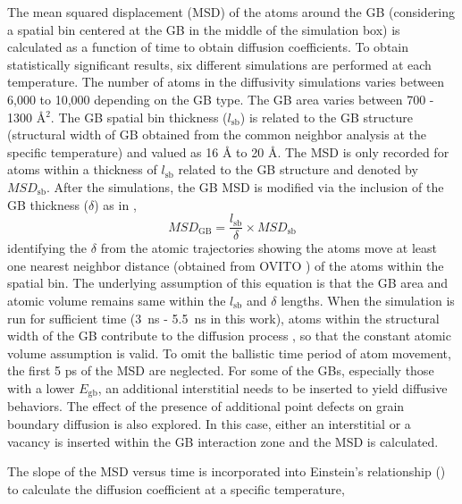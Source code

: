 \documentclass[review]{elsarticle}
\providecommand{\DIFaddtex}[1]{{\bf #1}} %
\providecommand{\DIFdeltex}[1]{} %
\providecommand{\DIFaddbegin}{\protect\color{blue}} %
\providecommand{\DIFaddend}{\protect\color{black}} %
\providecommand{\DIFdelbegin}{\protect\color{red}} %
\providecommand{\DIFdelend}{\protect\color{black}} %
\providecommand{\DIFadd}[1]{\texorpdfstring{\DIFaddtex{#1}}{#1}} %
\providecommand{\DIFdel}[1]{\texorpdfstring{\DIFdeltex{#1}}{}} %
\newcommand{\DIFscaledelfig}{0.5}
\newlength{\DIFdelgraphicswidth} %
\newlength{\DIFdelgraphicsheight} %
\newcommand{\DIFaddincludegraphics}[2][]{{\color{blue}\fbox{\DIFOincludegraphics[#1]{#2}}}} %
\newcommand{\DIFdelincludegraphics}[2][]{%
\sbox{\DIFdelgraphicsbox}{\DIFOincludegraphics[#1]{#2}}%
\settoboxwidth{\DIFdelgraphicswidth}{\DIFdelgraphicsbox} %
\settoboxtotalheight{\DIFdelgraphicsheight}{\DIFdelgraphicsbox} %
\scalebox{\DIFscaledelfig}{%
\parbox[b]{\DIFdelgraphicswidth}{\usebox{\DIFdelgraphicsbox}\\[-\baselineskip] \rule{\DIFdelgraphicswidth}{0em}}\llap{\resizebox{\DIFdelgraphicswidth}{\DIFdelgraphicsheight}{%
\setlength{\unitlength}{\DIFdelgraphicswidth}%
\begin{picture}(1,1)%
\thicklines\linethickness{2pt} %
{\color[rgb]{1,0,0}\put(0,0){\framebox(1,1){}}}%
{\color[rgb]{1,0,0}\put(0,0){\line( 1,1){1}}}%
{\color[rgb]{1,0,0}\put(0,1){\line(1,-1){1}}}%
\end{picture}%
}\hspace*{3pt}}} %
} %
\DeclareRobustCommand{\DIFaddbegin}{\DIFOaddbegin \let\includegraphics\DIFaddincludegraphics} %
\DeclareRobustCommand{\DIFaddend}{\DIFOaddend \let\includegraphics\DIFOincludegraphics} %
\DeclareRobustCommand{\DIFdelbegin}{\DIFOdelbegin \let\includegraphics\DIFdelincludegraphics} %
\DeclareRobustCommand{\DIFdelend}{\DIFOaddend \let\includegraphics\DIFOincludegraphics} %
\begin{document}
The mean squared displacement (MSD) of the atoms around the GB (considering a spatial bin centered at the GB in the middle of the simulation box) is calculated as a function of time to obtain diffusion coefficients. To obtain statistically significant results, six different simulations are performed at each temperature. The number of atoms in the diffusivity simulations varies between 6,000 to 10,000 depending on the GB type. The GB area varies between 700 - 1300 {\AA${^2}$}. The GB spatial bin thickness ($l_{\mathrm{sb}}$) is related to the GB structure (structural width of GB \cite{keblinski1999self} obtained from the common neighbor analysis at the specific temperature) and valued as 16 {\AA} to 20 {\AA}. The MSD is only recorded for atoms within a thickness of $l_{\mathrm{sb}}$ related to the GB structure and denoted by $MSD_{\mathrm{sb}}$. After the simulations, the GB MSD is modified via the inclusion of the GB thickness (\DIFdelbegin \DIFdel{$l_{\mathrm{GB}}$}\DIFdelend \DIFaddbegin \DIFadd{$\delta$}\DIFaddend ) as in  \cite{USi_diffusion}, 
%
\begin{equation}
\label{eq:dim}
MSD_{\mathrm{GB}} =\frac{l_{\mathrm{sb}}}{\delta} \times MSD_{\mathrm{sb}}
\end{equation}
%
identifying the $\delta$ from the atomic trajectories showing the atoms move at least one nearest neighbor distance (obtained from OVITO \cite{ovito}) of the atoms within the spatial bin. The underlying assumption of this equation is that the GB area and atomic volume remains same within the $l_{\mathrm{sb}}$ and $\delta$ lengths. When the simulation is run for sufficient time (3~ns - 5.5~ns in this work), atoms within the structural width of the GB contribute to the diffusion process \cite{keblinski1999self}, so that the constant atomic volume assumption is valid. To omit the ballistic time period of atom movement, the first 5 ps of the MSD are neglected. For some of the GBs, especially those with a lower $E_{\mathrm{gb}}$, an additional interstitial needs to be inserted to yield diffusive behaviors. The effect of the presence of additional point defects on grain boundary diffusion is also explored. In this case, either an interstitial or a vacancy is inserted within the GB interaction zone and the MSD is calculated.

\par The slope of the MSD versus time is incorporated into Einstein's relationship () to calculate the diffusion coefficient at a specific temperature,
\end{document}

